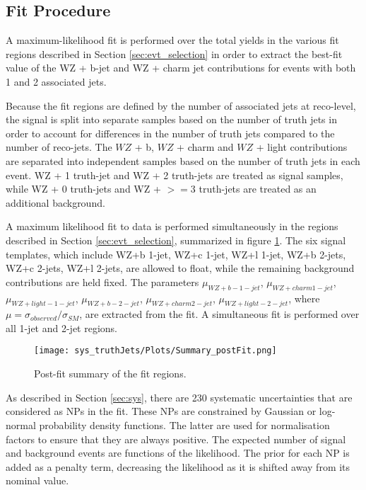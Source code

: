 
\subsection{Fit Procedure}
\label{sec:fit}

A maximum-likelihood fit is performed over the total yields in the various fit regions described in Section \ref{sec:evt_selection} in order to extract the best-fit value of the WZ + b-jet and WZ + charm jet contributions for events with both 1 and 2 associated jets.

Because the fit regions are defined by the number of associated jets at reco-level, the signal is split into separate samples based on the number of truth jets in order to account for differences in the number of truth jets compared to the number of reco-jets. The $WZ$ + b, $WZ$ + charm and $WZ$ + light contributions are separated into independent samples based on the number of truth jets in each event. WZ + 1 truth-jet and WZ + 2 truth-jets are treated as signal samples, while WZ + 0 truth-jets and WZ + $>=$3 truth-jets are treated as an additional background. 

A maximum likelihood fit to data is performed simultaneously in the regions described in Section \ref{sec:evt_selection}, summarized in figure \ref{fig:summary}. The six signal templates, which include WZ+b 1-jet, WZ+c 1-jet, WZ+l 1-jet, WZ+b 2-jets, WZ+c 2-jets, WZ+l 2-jets, are allowed to float, while the remaining background contributions are held fixed. The parameters $\mu_{WZ+b - 1-jet}$, $\mu_{WZ+charm 1-jet}$, $\mu_{WZ+light - 1-jet}$, $\mu_{WZ+b - 2-jet}$, $\mu_{WZ+charm 2-jet}$, $\mu_{WZ+light - 2-jet}$, where $\mu = \sigma_{observed}/\sigma_{SM} $, are extracted from the fit. A simultaneous fit is performed over all 1-jet and 2-jet regions.

\begin{figure}[H]
  \center                                                                                                                    
  \texttt{[image: sys\_truthJets/Plots/Summary\_postFit.png]}
  \caption{Post-fit summary of the fit regions.}
  \label{fig:summary}
\end{figure}

As described in Section \ref{sec:sys}, there are 230 systematic uncertainties that are considered as NPs in the fit. These NPs are constrained by Gaussian or log-normal probability density functions. The latter are used for normalisation factors to ensure that they are always positive. The expected number of signal and background events are functions of the likelihood. The prior for each NP is added as a penalty term, decreasing the likelihood as it is shifted away from its nominal value.

